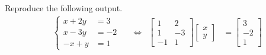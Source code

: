 \begin{exercisebox}
\begin{Exercise}
Reproduce the following output.
\begin{align}
&\left\{\begin{aligned}
x + 2y &= 3 \\
x - 3y &= -2 \\
-x + y &= 1
\end{aligned}\right.
& & \Leftrightarrow
&\begin{bmatrix}
1 & 2 \\
1 & -3 \\
-1 & 1
\end{bmatrix}
\begin{bmatrix}
x \\
y
\end{bmatrix}
&=
\begin{bmatrix}
3 \\
-2 \\
1
\end{bmatrix}
\end{align}
\end{Exercise}
\end{exercisebox}